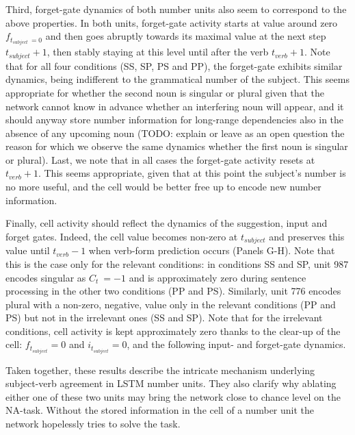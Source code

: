 Third, forget-gate dynamics of both number units also seem to correspond to the above properties. 
In both units, forget-gate activity starts at value around zero $f_{t_{subject}~=0}$ and then goes abruptly towards its maximal value at the next step $t_{subject}+1$, then stably staying at this level until after the verb $t_{verb}+1$. 
Note that for all four conditions (SS, SP, PS and PP), the forget-gate exhibits similar dynamics, being indifferent to the grammatical number of the subject. 
This seems appropriate for whether the second noun is singular or plural given that the network cannot know in advance whether an interfering noun will appear, and it should anyway store number information for long-range dependencies also in the absence of any upcoming noun (TODO: explain or leave as an open question the reason for which we observe the same dynamics whether the first noun is singular or plural). 
Last, we note that in all cases the forget-gate activity resets at $t_{verb}+1$. 
This seems appropriate, given that at this point the subject's number is no more useful, and the cell would be better free up to encode new number information.
 
Finally, cell activity should reflect the dynamics of the suggestion, input and forget gates. 
Indeed, the cell value becomes non-zero at $t_{subject}$ and preserves this value until $t_{verb}-1$ when verb-form prediction occurs (Panels G-H). 
Note that this is the case only for the relevant conditions: in conditions SS and SP, unit 987 encodes singular as $C_t ~= -1$ and is approximately zero during sentence processing in the other two conditions (PP and PS). 
Similarly, unit 776 encodes plural with a non-zero, negative, value only in the relevant conditions (PP and PS) but not in the irrelevant ones (SS and SP). 
Note that for the irrelevant conditions, cell activity is kept approximately zero thanks to the clear-up of the cell: $f_{t_{subject}}=0$ and $i_{t_{subject}}=0$, and the following input- and forget-gate dynamics.

Taken together, these results describe the intricate mechanism underlying subject-verb agreement in LSTM number units. 
They also clarify why ablating either one of these two units may bring the network close to chance level on the NA-task. 
Without the stored information in the cell of a number unit the network hopelessly tries to solve the task.



